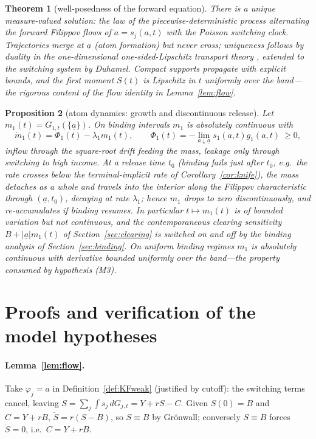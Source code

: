 \documentclass[11pt]{article}
\newtheorem{theorem}{Theorem}[section]
\newtheorem{proposition}[theorem]{Proposition}
\theoremstyle{definition}
\theoremstyle{remark}
\newcommand{\ubar}[1]{\underline{#1}}
\newcommand{\dd}{\,d}
\newcommand{\uba}{\ubar{a}}
\begin{document}
\begin{theorem}[well-posedness of the forward equation]\label{thm:KF}
There is a unique measure-valued solution: the law of the
piecewise-deterministic process alternating the forward Filippov flows
of $\dot a=s_j(a,t)$ with the Poisson switching clock. Trajectories
merge at $\uba$ (atom formation) but never cross; uniqueness follows
by duality in the one-dimensional one-sided-Lipschitz transport
theory \citep{Filippov1960,BouchutJames1998,PoupaudRascle1997},
extended to the switching system by Duhamel. Compact supports
propagate with explicit bounds, and the first moment $S(t)$ is
Lipschitz in $t$ uniformly over the band---the rigorous content of
the flow identity in Lemma~\ref{lem:flow}.
\end{theorem}

\begin{proposition}[atom dynamics: growth and discontinuous release]
\label{prop:atom}
Let $m_1(t)=G_{1,t}(\{\uba\})$. On binding intervals $m_1$ is
absolutely continuous with
\[
\dot m_1(t)=\Phi_1(t)-\lambda_1m_1(t),\qquad
\Phi_1(t)=-\lim_{a\downarrow\uba}s_1(a,t)g_1(a,t)\ \ge0,
\]
inflow through the square-root drift feeding the mass, leakage only
through switching to high income. At a release time $t_0$ (binding
fails just after $t_0$, e.g.\ the rate crosses below the
terminal-implicit rate of Corollary~\ref{cor:knife}), the mass
detaches \emph{as a whole} and travels into the interior along the
Filippov characteristic through $(\uba,t_0)$, decaying at rate
$\lambda_1$; hence $m_1$ drops to zero discontinuously, and
re-accumulates if binding resumes. In particular $t\mapsto m_1(t)$ is
of bounded variation but not continuous, and the contemporaneous
clearing sensitivity $B+|\uba|m_1(t)$ of
Section~\ref{sec:clearing} is switched on and off by the binding
analysis of Section~\ref{sec:binding}. On uniform binding regimes
$m_1$ is absolutely continuous with derivative bounded uniformly over
the band---the property consumed by hypothesis (M3).
\end{proposition}

\section{Proofs and verification of the model hypotheses}
\label{app:proofs}

\paragraph{Lemma~\ref{lem:flow}.} Take $\varphi_j=a$ in
Definition~\ref{def:KFweak} (justified by cutoff): the switching
terms cancel, leaving $\dot S=\sum_j\int s_j\dd G_{j,t}
=Y+rS-C$. Given $S(0)=B$ and $C=Y+rB$, $\dot S=r(S-B)$, so
$S\equiv B$ by Gr\"onwall; conversely $S\equiv B$ forces $\dot S=0$,
i.e.\ $C=Y+rB$.
\end{document}
